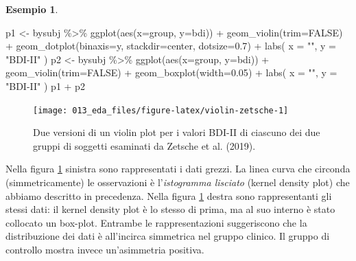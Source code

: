 \documentclass[
  10pt,
  italian,
  a4paper,
  extrafontsizes,onecolumn,openright
  ]{memoir}
\newenvironment{Shaded}{\begin{snugshade}}{\end{snugshade}}
\newcommand{\AttributeTok}[1]{\textcolor[rgb]{0.77,0.63,0.00}{#1}}
\newcommand{\ConstantTok}[1]{\textcolor[rgb]{0.00,0.00,0.00}{#1}}
\newcommand{\FloatTok}[1]{\textcolor[rgb]{0.00,0.00,0.81}{#1}}
\newcommand{\FunctionTok}[1]{\textcolor[rgb]{0.00,0.00,0.00}{#1}}
\newcommand{\NormalTok}[1]{#1}
\newcommand{\OtherTok}[1]{\textcolor[rgb]{0.56,0.35,0.01}{#1}}
\newcommand{\SpecialCharTok}[1]{\textcolor[rgb]{0.00,0.00,0.00}{#1}}
\newcommand{\StringTok}[1]{\textcolor[rgb]{0.31,0.60,0.02}{#1}}
\theoremstyle{definition}
\theoremstyle{definition}
\newtheorem{example}{Esempio}[chapter]
\theoremstyle{definition}
\theoremstyle{definition}
\theoremstyle{remark}
\begin{document}
\begin{example}
\begin{Shaded}
\begin{Highlighting}[]
\NormalTok{p1 }\OtherTok{\textless{}{-}}\NormalTok{ bysubj }\SpecialCharTok{\%\textgreater{}\%} 
  \FunctionTok{ggplot}\NormalTok{(}\FunctionTok{aes}\NormalTok{(}\AttributeTok{x=}\NormalTok{group, }\AttributeTok{y=}\NormalTok{bdi)) }\SpecialCharTok{+} 
  \FunctionTok{geom\_violin}\NormalTok{(}\AttributeTok{trim=}\ConstantTok{FALSE}\NormalTok{) }\SpecialCharTok{+}
  \FunctionTok{geom\_dotplot}\NormalTok{(}\AttributeTok{binaxis=}\StringTok{\textquotesingle{}y\textquotesingle{}}\NormalTok{, }\AttributeTok{stackdir=}\StringTok{\textquotesingle{}center\textquotesingle{}}\NormalTok{, }\AttributeTok{dotsize=}\FloatTok{0.7}\NormalTok{) }\SpecialCharTok{+}
  \FunctionTok{labs}\NormalTok{(}
    \AttributeTok{x =} \StringTok{""}\NormalTok{,}
    \AttributeTok{y =} \StringTok{"BDI{-}II"}
\NormalTok{  ) }
\NormalTok{p2 }\OtherTok{\textless{}{-}}\NormalTok{ bysubj }\SpecialCharTok{\%\textgreater{}\%} 
  \FunctionTok{ggplot}\NormalTok{(}\FunctionTok{aes}\NormalTok{(}\AttributeTok{x=}\NormalTok{group, }\AttributeTok{y=}\NormalTok{bdi)) }\SpecialCharTok{+} 
  \FunctionTok{geom\_violin}\NormalTok{(}\AttributeTok{trim=}\ConstantTok{FALSE}\NormalTok{) }\SpecialCharTok{+}
  \FunctionTok{geom\_boxplot}\NormalTok{(}\AttributeTok{width=}\FloatTok{0.05}\NormalTok{) }\SpecialCharTok{+}
  \FunctionTok{labs}\NormalTok{(}
    \AttributeTok{x =} \StringTok{""}\NormalTok{,}
    \AttributeTok{y =} \StringTok{"BDI{-}II"}
\NormalTok{  ) }
\NormalTok{p1 }\SpecialCharTok{+}\NormalTok{ p2}
\end{Highlighting}
\end{Shaded}

\begin{figure}[h]

{\centering \texttt{[image: 013\_eda\_files/figure-latex/violin-zetsche-1]} 

}

\caption{Due versioni di un violin plot per i valori BDI-II di ciascuno dei due gruppi di soggetti esaminati da Zetsche et al. (2019).}\label{fig:violin-zetsche}
\end{figure}

Nella figura \ref{fig:violin-zetsche} sinistra sono rappresentati i dati grezzi. La linea curva che circonda (simmetricamente) le osservazioni è l'\emph{istogramma lisciato} (kernel density plot) che abbiamo descritto in precedenza. Nella figura \ref{fig:violin-zetsche} destra sono rappresentanti gli stessi dati: il kernel density plot è lo stesso di prima, ma al suo interno è stato collocato un box-plot. Entrambe le rappresentazioni suggeriscono che la distribuzione dei dati è all'incirca simmetrica nel gruppo clinico. Il gruppo di controllo mostra invece un'asimmetria positiva.
\end{example}
\end{document}
